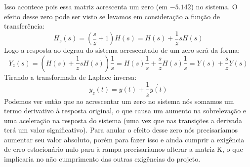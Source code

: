 \documentclass{article}
\begin{document}
Isso acontece pois essa matriz acrescenta um zero (em $- 5.142$) no sistema. O efeito desse zero pode ser visto se levamos em consideração a função de transferência:
\begin{equation}
	H_z(s) = (\frac{s}{z} + 1)H(s) = H(s) + \frac{1}{z}sH(s)
\end{equation}
Logo a resposta ao degrau do sistema acrescentado de um zero será da forma:
\begin{equation}
Y_z(s) = (H(s) + \frac{1}{z}sH(s))\frac{1}{s} = H(s)\frac{1}{s} + \frac{s}{z}H(s)\frac{1}{s} = Y(s) + \frac{s}{z}Y(s)
\end{equation}
Tirando a transformada de Laplace inversa:
\begin{equation}
y_z(t) = y(t) + \frac{1}{z}\dot{y(t)}
\end{equation}
Podemos ver então que ao acrescentar um zero no sistema nós somamos um termo derivativo à resposta original, o que causa um aumento na sobrelevação e uma aceleração na resposta do sistema (uma vez que nas transições a derivada terá um valor significativo). Para anular o efeito desse zero nós precisaríamos aumentar seu valor absoluto, porém para fazer isso e ainda cumprir a exigência de erro estacionário nulo para à rampa precisaríamos alterar a matriz K, o que implicaria no não cumprimento das outras exigências do projeto.
\begin{thebibliography}{widestlabel}
\end{thebibliography}
\end{document}
